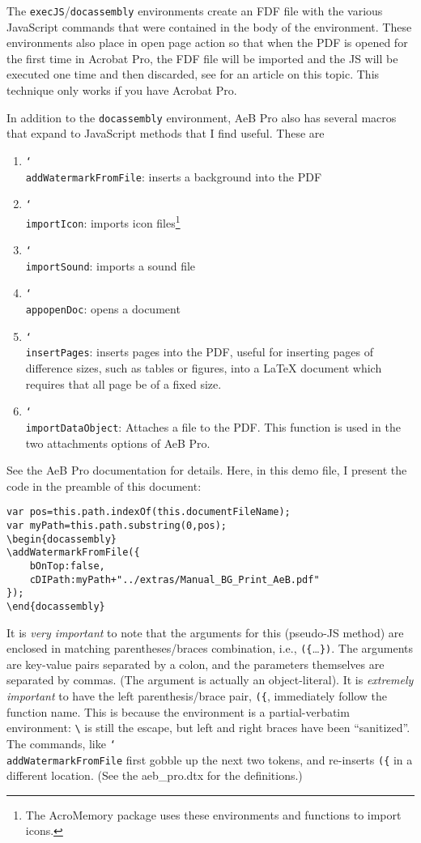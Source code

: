 \documentclass{article}
\newcommand{\cs}[1]{\texttt{\char`\\#1}}
\begin{document}
The \texttt{execJS}/\texttt{docassembly} environments create an FDF
file with the various JavaScript commands that were contained in the
body of the environment. These environments also place in open page
action so that when the PDF is opened for the first time in Acrobat
Pro, the FDF file will be imported and the JS will be executed one
time and then discarded, see \cite{TUG:execJS} for an article on this topic.
This technique only works if you have Acrobat Pro.

In addition to the \texttt{docassembly} environment, AeB Pro also
has several macros that expand to JavaScript methods that I find
useful. These are
\begin{enumerate}
    \item \cs{addWatermarkFromFile}: inserts a background into the PDF

    \item \cs{importIcon}: imports icon files\footnote{The
    AcroMemory package uses these environments and functions to
    import icons.}

    \item \cs{importSound}: imports a sound file

    \item \cs{appopenDoc}: opens a document

    \item \cs{insertPages}: inserts pages into the PDF, useful for
    inserting pages of difference sizes, such as tables or figures,
    into a {\LaTeX} document which requires that all page be of a
    fixed size.

    \item \cs{importDataObject}: Attaches a file to the PDF. This
    function is used in the two attachments options of AeB Pro.
\end{enumerate}
See the AeB Pro documentation for details.  Here, in this demo file,
I present the code in the preamble of this document:
\begin{Verbatim}
var pos=this.path.indexOf(this.documentFileName);
var myPath=this.path.substring(0,pos);
\begin{docassembly}
\addWatermarkFromFile({
    bOnTop:false,
    cDIPath:myPath+"../extras/Manual_BG_Print_AeB.pdf"
});
\end{docassembly}
\end{Verbatim}
It is \emph{very important} to note that the arguments for this
(pseudo-JS method) are enclosed in matching parentheses/braces
combination, i.e., \verb!({!\dots\verb!})!. The arguments are
key-value pairs separated by a colon, and the parameters themselves
are separated by commas. (The argument is actually an
object-literal).  It is \emph{extremely important} to have the left
parenthesis/brace pair, \verb!({!, immediately follow the function
name. This is because the environment is a partial-verbatim
environment: \verb!\! is still the escape, but left and right braces
have been ``sanitized''.  The commands, like
\cs{addWatermarkFromFile} first gobble up the next two tokens, and
re-inserts \verb!({! in a different location. (See the
\textsf{aeb\_pro.dtx} for the definitions.)
\end{document}

